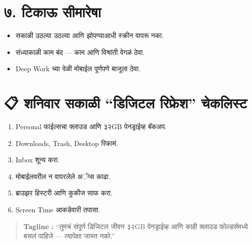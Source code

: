 \section*{७. टिकाऊ सीमारेषा}

\begin{itemize}
  \item सकाळी उठल्या उठल्या आणि झोपण्याआधी स्क्रीन वापरू नका.  
  \item संध्याकाळी काम बंद — काम आणि विश्रांती वेगळं ठेवा.  
  \item Deep Work च्या वेळी मोबाईल पूर्णपणे बाजूला ठेवा.  
\end{itemize}

\section*{📋 शनिवार सकाळी “डिजिटल रिफ्रेश” चेकलिस्ट}
\begin{enumerate}
  \item Personal फाईल्सचा क्लाउड आणि ३२GB पेनड्राईव्ह बॅकअप.  
  \item Downloads, Trash, Desktop रिकामं.  
  \item Inbox शून्य करा.  
  \item मोबाईलवरील न वापरलेले अॅप्स काढा.  
  \item ब्राउझर हिस्टरी आणि कुकीज साफ करा.  
  \item Screen Time आकडेवारी तपासा.  
\end{enumerate}

\begin{quote}
\textbf{Tagline :} “तुमचं संपूर्ण डिजिटल जीवन ३२GB पेनड्राईव्ह आणि काही क्लाउड फोल्डर्समध्ये बसलं पाहिजे — त्यापेक्षा जास्त नको.”  
\end{quote}
